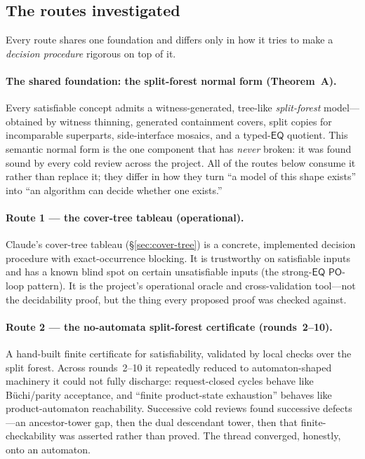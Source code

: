 \documentclass[
]{ceurart}
\theoremstyle{definition}
\newcommand{\PO}{\ensuremath{\mathsf{PO}}}
\newcommand{\EQ}{\ensuremath{\mathsf{EQ}}}
\begin{document}
\subsection{The routes investigated}
\label{ssec:routes}

Every route shares one foundation and differs only in how it tries to
make a \emph{decision procedure} rigorous on top of it.

\paragraph{The shared foundation: the split-forest normal form (Theorem~A).}
Every satisfiable concept admits a witness-generated, tree-like
\emph{split-forest} model---obtained by witness thinning, generated
containment covers, split copies for incomparable superparts,
side-interface mosaics, and a typed-$\EQ$ quotient.  This semantic normal
form is the one component that has \emph{never} broken: it was found
sound by every cold review across the project.  All of the routes below
consume it rather than replace it; they differ in how they turn ``a
model of this shape exists'' into ``an algorithm can decide whether one
exists.''

\paragraph{Route 1 --- the cover-tree tableau (operational).}
Claude's cover-tree tableau (\S\ref{sec:cover-tree}) is a concrete,
implemented decision procedure with exact-occurrence blocking.  It is
trustworthy on satisfiable inputs and has a known blind spot on certain
unsatisfiable inputs (the strong-$\EQ$ \PO-loop pattern).  It is the
project's operational oracle and cross-validation tool---not the
decidability proof, but the thing every proposed proof was checked
against.

\paragraph{Route 2 --- the no-automata split-forest certificate (rounds~2--10).}
A hand-built finite certificate for satisfiability, validated by local
checks over the split forest.  Across rounds~2--10 it repeatedly reduced
to automaton-shaped machinery it could not fully discharge:
request-closed cycles behave like B\"uchi/parity acceptance, and ``finite
product-state exhaustion'' behaves like product-automaton reachability.
Successive cold reviews found successive defects---an ancestor-tower gap,
then the dual descendant tower, then that finite-checkability was
asserted rather than proved.  The thread converged, honestly, onto an
automaton.
\end{document}

